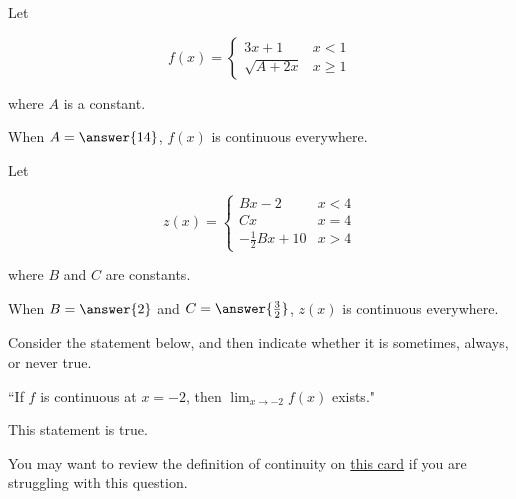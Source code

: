 \documentclass[handout]{ximera}
\begin{document}
\begin{exercise}
Let 

\[
f(x) = \begin{cases}
  3x+1 & x < 1 \\
  \sqrt{A+2x}  & x \geq 1
\end{cases}
\]

where $A$ is a constant.  

When $A =\answer{14}$, $f(x)$ is continuous everywhere. 

\end{exercise}

\begin{exercise}
Let 

\[
z(x) = \begin{cases}
  Bx-2  & x < 4 \\
  Cx & x = 4 \\
   -\frac{1}{2} Bx +10 & x > 4
\end{cases}
\]

where $B$ and $C$ are constants. 

When $B =\answer{2}$ and $C = \answer{\frac{3}{2}}$, $z(x)$ is continuous everywhere.

\end{exercise}

\begin{exercise}

Consider the statement below, and then indicate whether it is sometimes, always, or never true.

\begin{center} ``If $f$ is continuous at $x=-2$, then $\displaystyle\lim_{x\to -2} f(x)$ exists." \end{center}

This statement is  true.

\begin{hint}

You may want to review the definition of continuity on \href{https://ximera.osu.edu/math160fa17/m160exam1content/limitLaws/digInContinuity}{this card} if you are struggling with this question. 

\end{hint}

\end{exercise}
\end{document}
